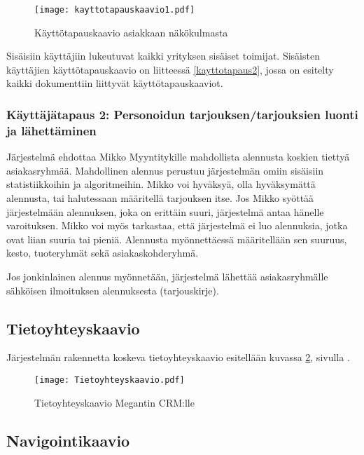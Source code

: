     \begin{figure}[H]
        \centering
        \texttt{[image: kayttotapauskaavio1.pdf]}
        \caption{Käyttötapauskaavio asiakkaan näkökulmasta}
        \label{img:kayttotapaus1}
    \end{figure}

    Sisäisiin käyttäjiin lukeutuvat kaikki yrityksen sisäiset toimijat. Sisäisten käyttäjien käyttötapauskaavio on liitteessä \ref{kayttotapaus2}, jossa on esitelty kaikki dokumenttiin liittyvät käyttötapauskaaviot. 

\subsubsection{Käyttäjätapaus 2: Personoidun tarjouksen/tarjouksien luonti ja lähet\-täminen}     %

    Järjestelmä ehdottaa Mikko Myyntitykille mahdollista alennusta koskien tiettyä asiakasryhmää.
    Mahdollinen alennus perustuu järjestelmän omiin sisäisiin statistiikkoihin ja algoritmeihin.
    Mikko voi hyväksyä, olla hyväksymättä alennusta, tai halutessaan määritellä tarjouksen itse.
    Jos Mikko syöttää järjestelmään alennuksen, joka on erittäin suuri, järjestelmä antaa hänelle varoituksen.
    Mikko voi myös tarkastaa, että järjestelmä ei luo alennuksia, jotka ovat liian suuria tai pieniä.
    Alennusta myönnettäessä määritellään sen suuruus, kesto, tuoteryhmät sekä asiakaskohderyhmä.

    Jos jonkinlainen alennus myönnetään, järjestelmä lähettää asiakasryhmälle säh\-köisen ilmoituksen alennuksesta (tarjouskirje).

\subsection{Tietoyhteyskaavio}   %

    Järjestelmän rakennetta koskeva tietoyhteyskaavio esitellään kuvassa \ref{img:tietoyhteyskaavio}, sivulla \pageref{img:tietoyhteyskaavio}.

    \begin{figure}[h]
        \centering
        \texttt{[image: Tietoyhteyskaavio.pdf]}
        \caption{Tietoyhteyskaavio Megantin CRM:lle}
        \label{img:tietoyhteyskaavio}
    \end{figure}

    \pagebreak

\subsection{Navigointikaavio}     %
    
